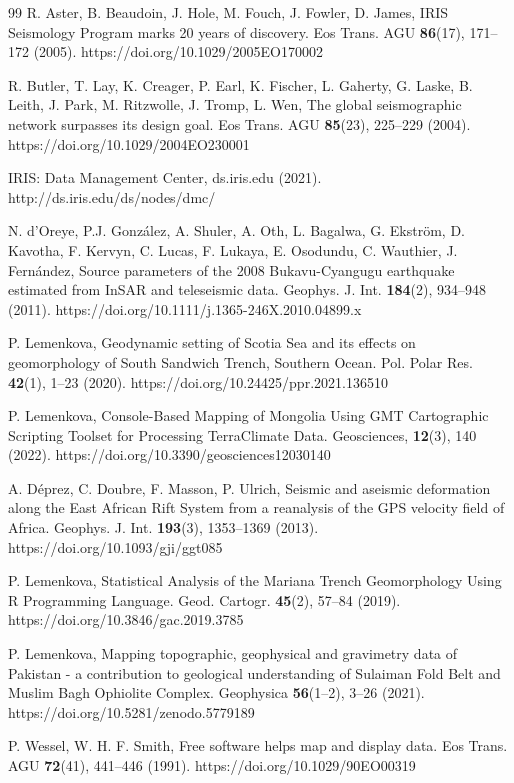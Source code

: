 \documentclass[myclassdoc,debug]{rjparticle}
\begin{document}
\begin{thebibliography}{99}
R. Aster, B. Beaudoin, J. Hole, M. Fouch, J. Fowler, D. James, IRIS Seismology Program marks 20 years of discovery. Eos Trans. AGU \textbf{86}(17), 171--172 (2005). https://doi.org/10.1029/2005EO170002 

R. Butler, T. Lay, K. Creager, P. Earl, K. Fischer, L. Gaherty,  G. Laske, B. Leith, J. Park, M. Ritzwolle, J. Tromp, L. Wen, The global seismographic network surpasses its design goal. Eos Trans. AGU \textbf{85}(23), 225--229 (2004). https://doi.org/10.1029/2004EO230001

IRIS: Data Management Center, ds.iris.edu (2021). http://ds.iris.edu/ds/nodes/dmc/

N. d’Oreye, P.J. González, A. Shuler, A. Oth, L. Bagalwa, G. Ekstr\"{o}m,  D. Kavotha, F. Kervyn, C. Lucas, F. Lukaya, E. Osodundu, C. Wauthier, J. Fernández, Source parameters of the 2008 Bukavu-Cyangugu earthquake estimated from InSAR and teleseismic data. Geophys. J. Int. \textbf{184}(2), 934--948 (2011). https://doi.org/10.1111/j.1365-246X.2010.04899.x

P. Lemenkova, Geodynamic setting of Scotia Sea and its effects on geomorphology of South Sandwich Trench, Southern Ocean. Pol. Polar Res. \textbf{42}(1), 1--23 (2020). https://doi.org/10.24425/ppr.2021.136510

P. Lemenkova, Console-Based Mapping of Mongolia Using GMT Cartographic Scripting Toolset for Processing TerraClimate Data. Geosciences, \textbf{12}(3), 140 (2022). https://doi.org/10.3390/geosciences12030140 

A. D\'{e}prez, C. Doubre, F. Masson, P. Ulrich, Seismic and aseismic deformation along the East African Rift System from a reanalysis of the GPS velocity field of Africa. Geophys. J. Int. \textbf{193}(3), 1353--1369 (2013). https://doi.org/10.1093/gji/ggt085

P. Lemenkova, Statistical Analysis of the Mariana Trench Geomorphology Using R Programming Language. Geod. Cartogr. \textbf{45}(2), 57--84 (2019). https://doi.org/10.3846/gac.2019.3785

P. Lemenkova, Mapping topographic, geophysical and gravimetry data of Pakistan - a contribution to geological understanding of Sulaiman Fold Belt and Muslim Bagh Ophiolite Complex. Geophysica \textbf{56}(1--2), 3--26 (2021). https://doi.org/10.5281/zenodo.5779189

P. Wessel, W. H. F. Smith, Free software helps map and display data. Eos Trans. AGU \textbf{72}(41), 441--446 (1991). https://doi.org/10.1029/90EO00319


\end{thebibliography}
\end{document}
